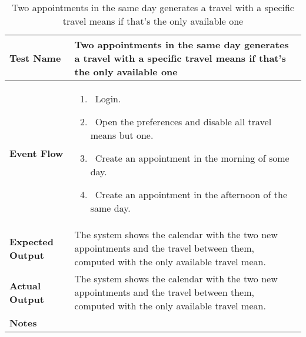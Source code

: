 \begin{table}[h]	
\centering
\def\arraystretch{1.5}
\begin{tabular}{|m{7cm}|m{7cm}|}
	\hline
	\textbf{Test Name}            &  Two appointments in the same day generates a travel with a specific travel means if that's the only available one  \\ \hline
	\textbf{Event Flow}             &   
		\begin{enumerate}
			\item~Login.
			\item~Open the preferences and disable all travel means but one.
			\item~Create an appointment in the morning of some day.
			\item~Create an appointment in the afternoon of the same day.
		\end{enumerate}
	\\ \hline
	\textbf{Expected Output}  &   The system shows the calendar with the two new appointments and the travel between them, computed with the only available travel mean.  \\ \hline
	\textbf{Actual Output}       &  The system shows the calendar with the two new appointments and the travel between them, computed with the only available travel mean.   \\ \hline
	\textbf{Notes} & \\ \hline
\end{tabular}
\caption{Two appointments in the same day generates a travel with a specific travel means if that's the only available one}
\end{table}